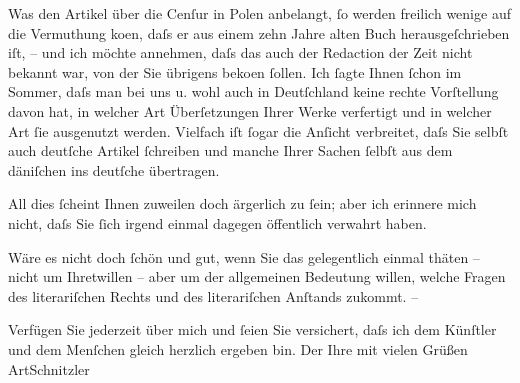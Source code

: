 \pstart
           Was den Artikel über die Cenſur in
                     Polen anbelangt, ſo werden freilich wenige auf die Vermuthung ko{\geminationm}en, daſs er aus einem {\pb}zehn Jahre alten Buch herausgeſchrieben iſt, – und
               ich möchte annehmen, daſs das auch der Redaction der Zeit nicht bekannt war, von der Sie übrigens \label{K_L00602-1v}\label{K_L00602-1} beko{\geminationm}en
               ſollen. Ich ſagte Ihnen ſchon im Sommer, daſs man bei uns u. wohl auch in Deutſchland keine rechte Vorſtellung davon hat, in
               welcher Art Überſetzungen Ihrer Werke verfertigt und in welcher Art ſie ausgenutzt
               werden. Vielfach iſt ſogar die Anſicht verbreitet, daſs Sie selbſt auch deutſche
               Artikel ſchreiben und manche Ihrer Sachen ſelbſt aus dem däniſchen ins deutſche übertragen.\pend
           
\pstart
           {\pb}All dies ſcheint Ihnen zuweilen doch ärgerlich zu
               ſein; aber ich erinnere mich nicht, daſs Sie ſich irgend einmal dagegen öffentlich
               verwahrt haben.\pend
           
\pstart
           Wäre es nicht doch ſchön und gut, wenn Sie das gelegentlich einmal thäten – nicht um
               Ihretwillen – aber um der allgemeinen Bedeutung willen, welche Fragen des
               literariſchen Rechts und des literariſchen Anſtands zukommt. –\pend
           
\pstart
           Verfügen Sie jederzeit über mich und ſeien Sie versichert, daſs ich dem Künſtler und
               dem Menſchen gleich herzlich ergeben bin.\pend
           \pstart Der Ihre mit vielen Grüßen \spacefill\mbox{ArtSchnitzler}\pend{}\endnumbering{}  
      